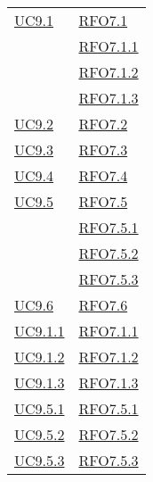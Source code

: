 \begin{longtable}{|>{\centering}m{5cm}|m{5cm}<{\centering}|}
\hyperlink{UC9.1}{UC9.1} 
& \hyperlink{RFO7.1}{RFO7.1}\\
& \hyperlink{RFO7.1.1}{RFO7.1.1}\\
& \hyperlink{RFO7.1.2}{RFO7.1.2}\\
& \hyperlink{RFO7.1.3}{RFO7.1.3}\\\hline

\hyperlink{UC9.2}{UC9.2} & \hyperlink{RFO7.2}{RFO7.2}\\\hline
\hyperlink{UC9.3}{UC9.3} & \hyperlink{RFO7.3}{RFO7.3}\\\hline
\hyperlink{UC9.4}{UC9.4} & \hyperlink{RFO7.4}{RFO7.4}\\\hline
\hyperlink{UC9.5}{UC9.5} 
& \hyperlink{RFO7.5}{RFO7.5}\\
& \hyperlink{RFO7.5.1}{RFO7.5.1}\\
& \hyperlink{RFO7.5.2}{RFO7.5.2}\\
& \hyperlink{RFO7.5.3}{RFO7.5.3}\\\hline
\hyperlink{UC9.6}{UC9.6} & \hyperlink{RFO7.6}{RFO7.6}\\\hline

\hyperlink{UC9.1.1}{UC9.1.1} & \hyperlink{RFO7.1.1}{RFO7.1.1}\\\hline
\hyperlink{UC9.1.2}{UC9.1.2} & \hyperlink{RFO7.1.2}{RFO7.1.2}\\\hline
\hyperlink{UC9.1.3}{UC9.1.3} & \hyperlink{RFO7.1.3}{RFO7.1.3}\\\hline

\hyperlink{UC9.5.1}{UC9.5.1} & \hyperlink{RFO7.5.1}{RFO7.5.1}\\\hline
\hyperlink{UC9.5.2}{UC9.5.2} & \hyperlink{RFO7.5.2}{RFO7.5.2}\\\hline
\hyperlink{UC9.5.3}{UC9.5.3} & \hyperlink{RFO7.5.3}{RFO7.5.3}\\\hline


\end{longtable}
